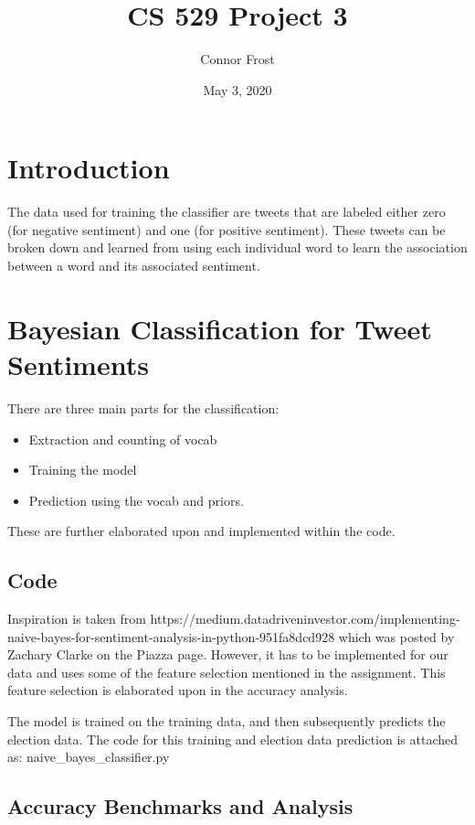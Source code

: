 \documentclass{article}
\title{CS 529 Project 3}
\author{Connor Frost}
\date{May 3, 2020}
\begin{document}
\maketitle

\section*{Introduction}

The data used for training the classifier are tweets that are labeled either zero (for negative sentiment) and one (for positive sentiment). These tweets can be broken down and learned from using each individual word to learn the association between a word and its associated sentiment.

\section{Bayesian Classification for Tweet Sentiments}

There are three main parts for the classification:

\begin{itemize}
    \item Extraction and counting of vocab
    \item Training the model
    \item Prediction using the vocab and priors.
\end{itemize}

\noindent These are further elaborated upon and implemented within the code.

\subsection{Code}

Inspiration is taken from https://medium.datadriveninvestor.com/implementing-naive-bayes-for-sentiment-analysis-in-python-951fa8dcd928 which was posted by Zachary Clarke on the Piazza page. However, it has to be implemented for our data and uses some of the feature selection mentioned in the assignment. This feature selection is elaborated upon in the accuracy analysis. 

\noindent The model is trained on the training data, and then subsequently predicts the election data. The code for this training and election data prediction is attached as: naive\_bayes\_classifier.py

\subsection{Accuracy Benchmarks and Analysis}
\end{document}
